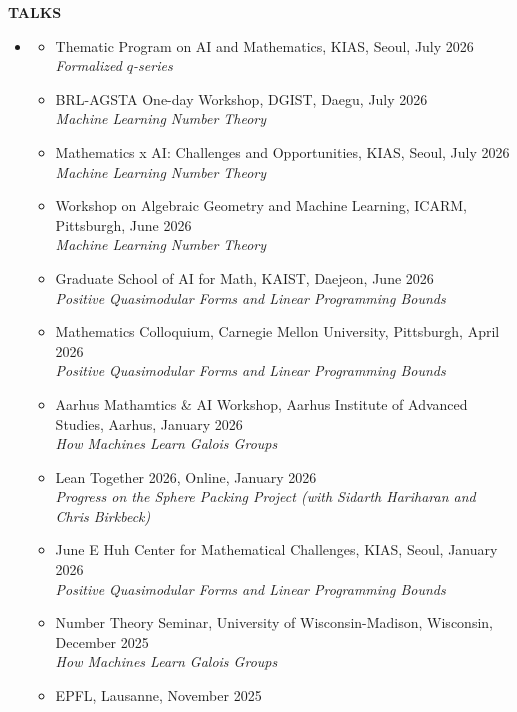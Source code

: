 \documentclass[letterpaper,11pt]{article}
\newcommand{\resheading}[1]{%
  \par\addvspace{10pt}%
  {\sffamily\bfseries\large\color{accent}\MakeUppercase{#1}}\par\nobreak
  \vspace{2pt}{\color{accent!35}\hrule height 0.7pt}\par\nobreak\vspace{5pt}}
\newcommand{\ressubsection}[1]{%
  \par\addvspace{4pt}{\sffamily\bfseries\color{muted}#1}\par\nobreak\vspace{2pt}}
\begin{document}


\resheading{Talks}
\begin{itemize}
	\item[] \ressubsection{Research Talks}
	\begin{itemize}
		\item Thematic Program on AI and Mathematics, KIAS, Seoul, July 2026 \\
		{\color{muted}\textit{Formalized $q$-series}}
		\item BRL-AGSTA One-day Workshop, DGIST, Daegu, July 2026 \\
		{\color{muted}\textit{Machine Learning Number Theory}}
		\item Mathematics x AI: Challenges and Opportunities, KIAS, Seoul, July 2026 \\
		{\color{muted}\textit{Machine Learning Number Theory}}
		\item Workshop on Algebraic Geometry and Machine Learning, ICARM, Pittsburgh, June 2026 \\
		{\color{muted}\textit{Machine Learning Number Theory}}
		\item Graduate School of AI for Math, KAIST, Daejeon, June 2026 \\
		{\color{muted}\textit{Positive Quasimodular Forms and Linear Programming Bounds}}
		\item Mathematics Colloquium, Carnegie Mellon University, Pittsburgh, April 2026 \\
		{\color{muted}\textit{Positive Quasimodular Forms and Linear Programming Bounds}}
		\item Aarhus Mathamtics \& AI Workshop, Aarhus Institute of Advanced Studies, Aarhus, January 2026 \\
		{\color{muted}\textit{How Machines Learn Galois Groups}}
		\item Lean Together 2026, Online, January 2026 \\
		{\color{muted}\textit{Progress on the Sphere Packing Project (with Sidarth Hariharan and Chris Birkbeck)}}
		\item June E Huh Center for Mathematical Challenges, KIAS, Seoul, January 2026 \\
		{\color{muted}\textit{Positive Quasimodular Forms and Linear Programming Bounds}}
		\item Number Theory Seminar, University of Wisconsin-Madison, Wisconsin, December 2025 \\
		{\color{muted}\textit{How Machines Learn Galois Groups}}
		\item EPFL, Lausanne, November 2025 \\

\end{itemize}
\end{itemize}
\end{document}

